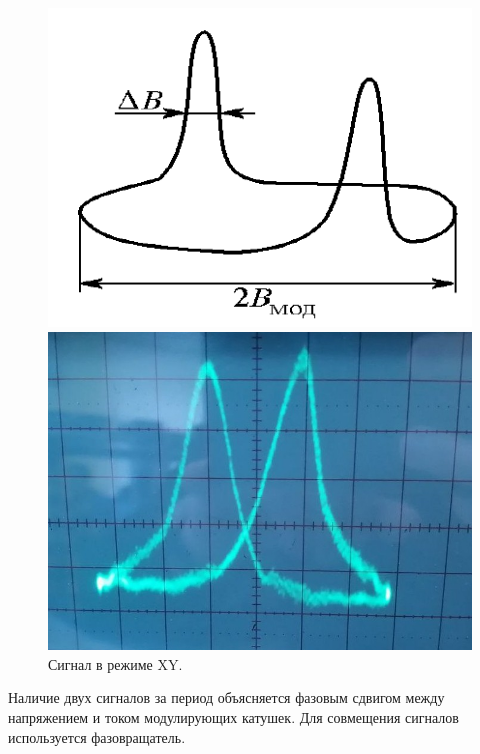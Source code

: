\documentclass[12pt,a4paper]{article}
\begin{document}
	\begin{figure}[H]
		\centering
		\begin{minipage}{0.5\textwidth}
			\centering
			\includegraphics[width=0.9\linewidth]{res/xy.png}
		\end{minipage}%
		\begin{minipage}{0.5\textwidth}
			\centering
			\includegraphics[width=1.0\linewidth]{photos/initial_setup.jpg}
		\end{minipage}
		\caption{Сигнал в режиме XY.}
		\label{fig:xy}
	\end{figure}
	
	Наличие двух сигналов за период объясняется фазовым сдвигом между напряжением и током модулирующих катушек. Для совмещения сигналов используется фазовращатель.
	
\end{document}
